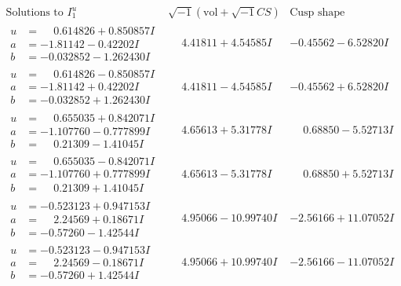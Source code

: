 \documentclass[1p]{elsarticle_modified}
\theoremstyle{definition}
\newcommand{\I}{\sqrt{-1}}
\begin{document}
$$\begin{array}{c|c|c}  
\text{Solutions to }I^u_{1}& \I (\text{vol} + \sqrt{-1}CS) & \text{Cusp shape}\\
 \hline 
\begin{aligned}
u &= \phantom{-}0.614826 + 0.850857 I \\
a &= -1.81142 - 0.42202 I \\
b &= -0.032852 - 1.262430 I\end{aligned}
 & \phantom{-}4.41811 + 4.54585 I & -0.45562 - 6.52820 I \\ \hline\begin{aligned}
u &= \phantom{-}0.614826 - 0.850857 I \\
a &= -1.81142 + 0.42202 I \\
b &= -0.032852 + 1.262430 I\end{aligned}
 & \phantom{-}4.41811 - 4.54585 I & -0.45562 + 6.52820 I \\ \hline\begin{aligned}
u &= \phantom{-}0.655035 + 0.842071 I \\
a &= -1.107760 - 0.777899 I \\
b &= \phantom{-}0.21309 - 1.41045 I\end{aligned}
 & \phantom{-}4.65613 + 5.31778 I & \phantom{-}0.68850 - 5.52713 I \\ \hline\begin{aligned}
u &= \phantom{-}0.655035 - 0.842071 I \\
a &= -1.107760 + 0.777899 I \\
b &= \phantom{-}0.21309 + 1.41045 I\end{aligned}
 & \phantom{-}4.65613 - 5.31778 I & \phantom{-}0.68850 + 5.52713 I \\ \hline\begin{aligned}
u &= -0.523123 + 0.947153 I \\
a &= \phantom{-}2.24569 + 0.18671 I \\
b &= -0.57260 - 1.42544 I\end{aligned}
 & \phantom{-}4.95066 - 10.99740 I & -2.56166 + 11.07052 I \\ \hline\begin{aligned}
u &= -0.523123 - 0.947153 I \\
a &= \phantom{-}2.24569 - 0.18671 I \\
b &= -0.57260 + 1.42544 I\end{aligned}
 & \phantom{-}4.95066 + 10.99740 I & -2.56166 - 11.07052 I \\ \hline\begin{aligned}

\end{aligned}
\end{array}$$
\end{document}
